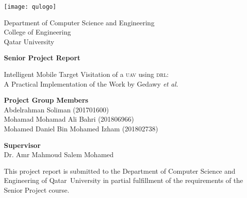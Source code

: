 \documentclass[../main.tex]{subfiles}
\begin{document}


        \centering
        \texttt{[image: qulogo]}

        \Large
        Department of Computer Science and Engineering\\
        College of Engineering\\
        Qatar University\\

        \vspace{2.5cm}

        \Huge
        \textbf{Senior Project Report}

        \vspace{1.0cm}
        \Large
        Intelligent Mobile Target Visitation of a \textsc{uav} using \textsc{drl}:\\
        A Practical Implementation of the Work by Gedawy \textit{et al.}

        \vspace{2.5cm}

        \raggedright
        \large
        \textbf{Project Group Members}\\
        \normalsize
        \medskip
        \-\hspace{0.5cm} Abdelrahman Soliman (201701600)\\
        \-\hspace{0.5cm} Mohamad Mohamad Ali Bahri (201806966)\\
        \-\hspace{0.5cm} Mohamed Daniel Bin Mohamed Izham (201802738)\\

        \vspace{1.0cm}

        \large
        \textbf{Supervisor}\\
        \normalsize
        \medskip
        \-\hspace{0.5cm} Dr. Amr Mahmoud Salem Mohamed\\

        \vfill

        \small

        \raggedright
        This project report is submitted to the Department
        of Computer Science and Engineering of Qatar~University 
        in partial fulfillment of the
        requirements of the Senior Project course.

        \vspace{0.8cm}
\end{document}

